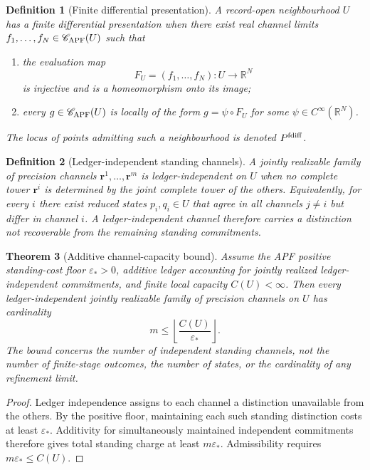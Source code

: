 \documentclass[11pt]{article}
\newtheorem{theorem}{Theorem}[section]
\newtheorem{definition}[theorem]{Definition}
\theoremstyle{remark}
\begin{document}
\begin{definition}[Finite differential presentation]
\label{def:locally-finitely-generated}
A record-open neighbourhood $U$ has a \emph{finite differential presentation}
when there exist real channel limits $f_1,\ldots,f_N\in\mathscr C_{\rm APF}(U)$ such that
\begin{enumerate}[label=(\roman*)]
\item the evaluation map
\[
F_U=(f_1,\ldots,f_N):U\to\mathbb R^N
\]
is injective and is a homeomorphism onto its image;
\item every $g\in\mathscr C_{\rm APF}(U)$ is locally of the form
$g=\psi\circ F_U$ for some $\psi\in C^\infty(\mathbb R^N)$.
\end{enumerate}
The locus of points admitting such a neighbourhood is denoted
$P^{\rm fdiff}$.
\end{definition}

\begin{definition}[Ledger-independent standing channels]
\label{def:independent-standing-channel}
A jointly realizable family of precision channels
$\mathbf r^1,\ldots,\mathbf r^m$ is \emph{ledger-independent} on $U$ when no
complete tower $\mathbf r^i$ is determined by the joint complete tower of the
others.  Equivalently, for every $i$ there exist reduced states $p_i,q_i\in U$
that agree in all channels $j\neq i$ but differ in channel $i$.  A
ledger-independent channel therefore carries a distinction not recoverable
from the remaining standing commitments.
\end{definition}

\begin{theorem}[Additive channel-capacity bound]
\label{thm:additive-channel-capacity}
Assume the APF positive standing-cost floor $\varepsilon_*>0$, additive ledger
accounting for jointly realized ledger-independent commitments, and finite
local capacity $C(U)<\infty$.  Then every ledger-independent jointly realizable
family of precision channels on $U$ has cardinality
\[
        m\le \left\lfloor\frac{C(U)}{\varepsilon_*}\right\rfloor.
\]
The bound concerns the number of independent standing channels, not the number
of finite-stage outcomes, the number of states, or the cardinality of any
refinement limit.
\end{theorem}

\begin{proof}
Ledger independence assigns to each channel a distinction unavailable from the
others.  By the positive floor, maintaining each such standing distinction
costs at least $\varepsilon_*$.  Additivity for simultaneously maintained
independent commitments therefore gives total standing charge at least
$m\varepsilon_*$.  Admissibility requires $m\varepsilon_*\le C(U)$.
\end{proof}
\end{document}
